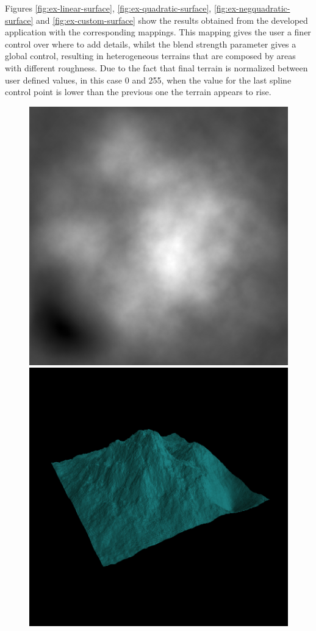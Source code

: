 	Figures \ref{fig:ex-linear-surface}, \ref{fig:ex-quadratic-surface}, \ref{fig:ex-negquadratic-surface} and \ref{fig:ex-custom-surface} show the results obtained from the developed application with the corresponding mappings. This mapping gives the user a finer control over where to add details, whilst the blend strength parameter gives a global control, resulting in heterogeneous terrains that are composed by areas with different roughness. Due to the fact that final terrain is normalized between user defined values, in this case 0 and 255, when the value for the last spline control point is lower than the previous one the terrain appears to rise.
	
	\begin{figure}[H]
		\centering
		\includegraphics[width=\imagewidth]{images/results/terrains/512-1/blending/linear}
		\includegraphics[width=\imagewidth]{images/results/terrains/512-1/blending/linear_3d}

\end{figure}
